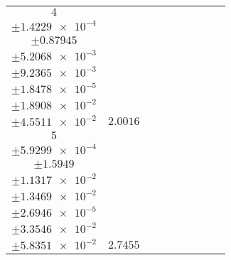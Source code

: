 \documentclass[8pt]{article}
\begin{document}
\begin{longtable}[l]{c c c c c c c c c}
$\num{4}$ & \begin{tabular}[c]{@{}c@{}}$\num{2.7191e-2}$ \\ $\pm\num{1.4229e-4}$\end{tabular} & \begin{tabular}[c]{@{}c@{}}$\num{-0.48444}$ \\ $\pm\num{0.87945}$\end{tabular} & \begin{tabular}[c]{@{}c@{}}$\num{-3.7128}$ \\ $\pm\num{5.2068e-3}$\end{tabular} & \begin{tabular}[c]{@{}c@{}}$\num{1.571e+3}$ \\ $\pm\num{9.2365e-3}$\end{tabular} & \begin{tabular}[c]{@{}c@{}}$\num{3.1428}$ \\ $\pm\num{1.8478e-5}$\end{tabular} & \begin{tabular}[c]{@{}c@{}}$\num{2.3418}$ \\ $\pm\num{1.8908e-2}$\end{tabular} & \begin{tabular}[c]{@{}c@{}}$\num{5.0009}$ \\ $\pm\num{4.5511e-2}$\end{tabular} & $\num{2.0016}$\\
$\num{5}$ & \begin{tabular}[c]{@{}c@{}}$\num{4.0452e-2}$ \\ $\pm\num{5.9299e-4}$\end{tabular} & \begin{tabular}[c]{@{}c@{}}$\num{0.20261}$ \\ $\pm\num{1.5949}$\end{tabular} & \begin{tabular}[c]{@{}c@{}}$\num{-1.9085}$ \\ $\pm\num{1.1317e-2}$\end{tabular} & \begin{tabular}[c]{@{}c@{}}$\num{1.5728e+3}$ \\ $\pm\num{1.3469e-2}$\end{tabular} & \begin{tabular}[c]{@{}c@{}}$\num{3.1465}$ \\ $\pm\num{2.6946e-5}$\end{tabular} & \begin{tabular}[c]{@{}c@{}}$\num{3.2211}$ \\ $\pm\num{3.3546e-2}$\end{tabular} & \begin{tabular}[c]{@{}c@{}}$\num{6.0567}$ \\ $\pm\num{5.8351e-2}$\end{tabular} & $\num{2.7455}$\\

\end{longtable}
\end{document}
